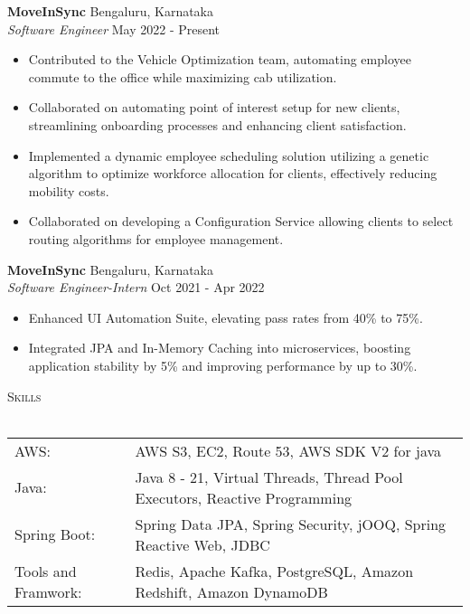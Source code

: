 \documentclass[a4paper]{article}
\newcommand{\lineunder} {
    \vspace*{-8pt} \\
    \hspace*{-18pt} \hrulefill \\
}
\newcommand{\header} [1] {
    {\hspace*{-18pt}\vspace*{6pt} \textsc{#1}}
    \vspace*{-6pt} \lineunder
}
\begin{document}
\textbf{MoveInSync} \hfill Bengaluru, Karnataka\\
\textit{Software Engineer} \hfill May 2022 - Present\\
\vspace{-1mm}
\begin{itemize} \itemsep 1pt
	\item Contributed to the Vehicle Optimization team, automating employee commute to the office while maximizing cab utilization.
	\item Collaborated on automating point of interest setup for new clients, streamlining onboarding processes and enhancing client satisfaction.
	\item Implemented a dynamic employee scheduling solution utilizing a genetic algorithm to optimize workforce allocation for clients, effectively reducing mobility costs.
	\item Collaborated on developing a Configuration Service allowing clients to select routing algorithms for employee management.
\end{itemize}
\textbf{MoveInSync} \hfill Bengaluru, Karnataka\\
\textit{Software Engineer-Intern} \hfill Oct 2021 - Apr 2022\\
\vspace{-1mm}
\begin{itemize} \itemsep 1pt
	\item Enhanced UI Automation Suite, elevating pass rates from 40\% to 75\%.
	\item Integrated JPA and In-Memory Caching into microservices, boosting application stability by 5\% and improving performance by up to 30\%.
\end{itemize}

\header{Skills}
\begin{tabular}{ l l }
	AWS:                  & AWS S3, EC2, Route 53, AWS SDK V2 for java                                \\
	Java:                 & Java 8 - 21, Virtual Threads, Thread Pool Executors, Reactive Programming \\
	Spring Boot:          & Spring Data JPA, Spring Security, jOOQ, Spring Reactive Web, JDBC         \\
    Tools and Framwork:   & Redis, Apache Kafka, PostgreSQL, Amazon Redshift, Amazon DynamoDB         \\
\end{tabular}
\vspace{2mm}
\end{document}
